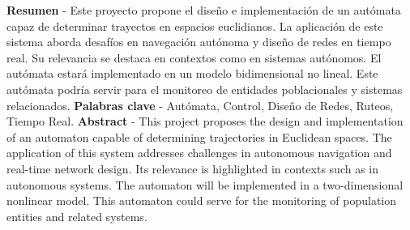     \textbf{Resumen} - Este proyecto propone el dise\~no e implementaci\'on de un aut\'omata
        capaz de determinar trayectos en espacios euclidianos. La aplicaci\'on de este sistema 
        aborda desaf\'ios en navegaci\'on aut\'onoma y dise\~no de redes en tiempo real.
        Su relevancia se destaca en contextos como en sistemas aut\'onomos. El aut\'omata
        estar\'a implementado en un modelo bidimensional no lineal. Este aut\'omata podr\'ia 
        servir para el monitoreo de entidades poblacionales y sistemas relacionados.
    \vskip 0.5cm    
    \textbf{Palabras clave} - Aut\'omata, Control, Dise\~no de Redes, Ruteos, Tiempo Real.
    \vskip 0.5cm
    \textbf{Abstract} - This project proposes the design and implementation of an automaton
        capable of determining trajectories in Euclidean spaces. The application of this system
        addresses challenges in autonomous navigation and real-time network design.
        Its relevance is highlighted in contexts such as in autonomous systems. The automaton
        will be implemented in a two-dimensional nonlinear model. This automaton could
        serve for the monitoring of population entities and related systems.
    
    
    